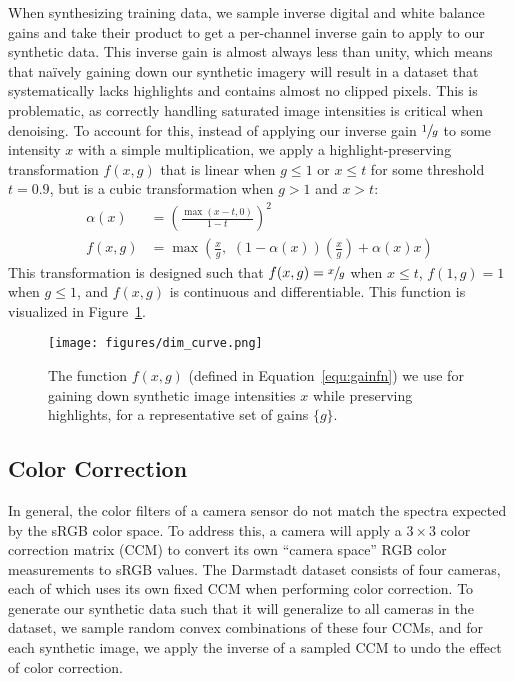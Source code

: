 \documentclass[10pt,twocolumn,letterpaper]{article}
\begin{document}
When synthesizing training data, we sample inverse digital and white balance gains and take their product to get a per-channel inverse gain to apply to our synthetic data.
This inverse gain is almost always less than unity, which means that na\"ively gaining down our synthetic imagery will result in a dataset that systematically lacks highlights and contains almost no clipped pixels. This is problematic, as correctly handling saturated image intensities is critical when denoising. To account for this, instead of applying our inverse gain $\sfrac{1}{g}$ to some intensity $x$ with a simple multiplication, we apply a highlight-preserving transformation $f(x,g)$ that is linear when $g \leq 1$ or $x \leq t$ for some threshold $t=0.9$, but is a cubic transformation when $g > 1$ and $x > t$:
\begin{align}
    \alpha(x) &= \left(\frac{\max(x - t, 0)}{1-t}\right)^2
    \\
    f(x,g) &= \max\left(\frac{x}{g},\,\, \left(1-\alpha(x)\right) \left( \frac{x}{g} \right) + \alpha(x) x\right)
    \label{equ:gainfn}
\end{align}
This transformation is designed such that $f(x,g) = \sfrac{x}{g}$ when $x \leq t$, $f(1,g) = 1$ when $g \leq 1$, and $f(x, g)$ is continuous and differentiable. This function is visualized in Figure~\ref{fig:dim_curve}.

\begin{figure}[t]
\begin{center}
   \texttt{[image: figures/dim\_curve.png]}
\end{center}
   \caption{The function $f(x, g)$ (defined in Equation~\ref{equ:gainfn}) we use for gaining down synthetic image intensities $x$ while preserving highlights, for a representative set of gains $\{g\}$.}
\label{fig:dim_curve}
\end{figure}


\subsection{Color Correction}
\label{sec:ccm}

In general, the color filters of a camera sensor do not match the spectra expected by the sRGB color space. To address this, a camera will apply a $3\times3$ color correction matrix (CCM) to convert its own ``camera space'' RGB color measurements to sRGB values. The Darmstadt dataset consists of four cameras, each of which uses its own fixed CCM when performing color correction. To generate our synthetic data such that it will generalize to all cameras in the dataset, we sample random convex combinations of these four CCMs, and for each synthetic image, we apply the inverse of a sampled CCM to undo the effect of color correction.
\end{document}
